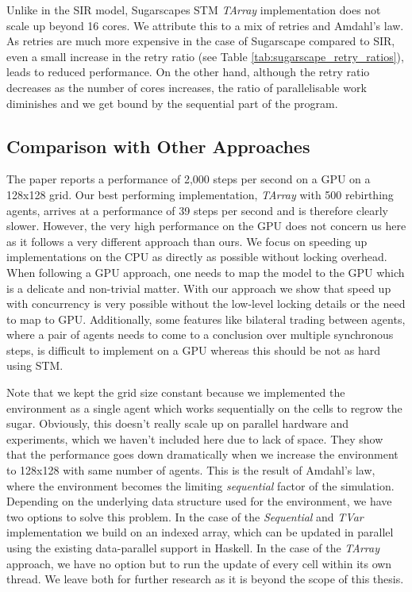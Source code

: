 Unlike in the SIR model, Sugarscapes STM \textit{TArray} implementation does not scale up beyond 16 cores. We attribute this to a mix of retries and Amdahl's law. As retries are much more expensive in the case of Sugarscape compared to SIR, even a small increase in the retry ratio (see Table \ref{tab:sugarscape_retry_ratios}), leads to reduced performance. On the other hand, although the retry ratio decreases as the number of cores increases, the ratio of parallelisable work diminishes and we get bound by the sequential part of the program.

\subsection{Comparison with Other Approaches}
The paper \cite{lysenko_framework_2008} reports a performance of 2,000 steps per second on a GPU on a 128x128 grid. Our best performing implementation, \textit{TArray} with 500 rebirthing agents, arrives at a performance of 39 steps per second and is therefore clearly slower. However, the very high performance on the GPU does not concern us here as it follows a very different approach than ours. We focus on speeding up implementations on the CPU as directly as possible without locking overhead. When following a GPU approach, one needs to map the model to the GPU which is a delicate and non-trivial matter. With our approach we show that speed up with concurrency is very possible without the low-level locking details or the need to map to GPU. Additionally, some features like bilateral trading between agents, where a pair of agents needs to come to a conclusion over multiple synchronous steps, is difficult to implement on a GPU whereas this should be not as hard using STM.

Note that we kept the grid size constant because we implemented the environment as a single agent which works sequentially on the cells to regrow the sugar. Obviously, this doesn't really scale up on parallel hardware and experiments, which we haven't included here due to lack of space. They show that the performance goes down dramatically when we increase the environment to 128x128 with same number of agents. This is the result of Amdahl's law, where the environment becomes the limiting \textit{sequential} factor of the simulation. Depending on the underlying data structure used for the environment, we have two options to solve this problem. In the case of the \textit{Sequential} and \textit{TVar} implementation we build on an indexed array, which can be updated in parallel using the existing data-parallel support in Haskell. In the case of the \textit{TArray} approach, we have no option but to run the update of every cell within its own thread. We leave both for further research as it is beyond the scope of this thesis.

